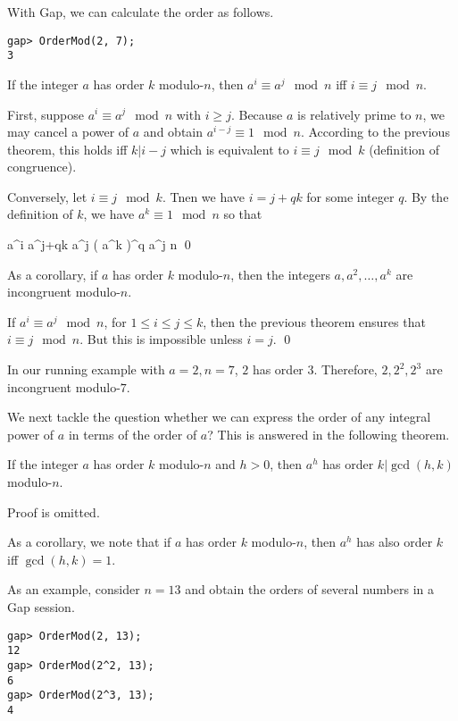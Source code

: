With Gap, we can calculate the order as follows.

\begin{verbatim}
gap> OrderMod(2, 7);
3
\end{verbatim}


\begin{theorem}\label{2021-03-02-th1}
  If the integer $a$ has order $k$ modulo-$n$, then $a^i \equiv a^j \mod n$ iff $i \equiv j \mod n$.
\end{theorem}

First, suppose $a^i \equiv a^j \mod n$ with $i \geq j$. Because $a$ is relatively prime to $n$, we may cancel a power of $a$ and obtain $a^{i-j} \equiv 1 \mod n$. According to the previous theorem, this holds iff $k | i-j$ which is equivalent to $i \equiv j \mod k$ (definition of congruence). 

Conversely, let $i \equiv j \mod k$. Tnen we have $i = j+  qk$ for some integer $q$. By the definition of $k$, we have $a^k \equiv 1 \mod n$ so that

\bee
a^i \equiv a^{j+qk} \equiv a^j \left( a^k \right)^q \equiv a^j \mod n \qed
\eee

As a corollary, if $a$ has order $k$ modulo-$n$, then the integers $a, a^2, \ldots, a^k$ are incongruent modulo-$n$.

If $a^i \equiv a^j \mod n$, for $1 \leq i \leq j \leq k$, then the previous theorem ensures that $i \equiv j \mod n$. But this is impossible unless $i=j$. \qed

In our running example with $a=2, n=7$, $2$ has order $3$. Therefore, $2, 2^2, 2^3$ are incongruent modulo-$7$.

We next tackle the question whether we can express the order of any integral power of $a$ in terms of the order of $a$? This is answered in the following theorem.

\begin{theorem}
  If the integer $a$ has order $k$ modulo-$n$ and $h > 0$, then $a^h$ has order $k | \gcd(h,k)$ modulo-$n$.
\end{theorem}

Proof is omitted.

As a corollary, we note that if $a$ has order $k$ modulo-$n$, then $a^h$ has also order $k$ iff $\gcd(h,k)=1$.

As an example, consider $n=13$ and obtain the orders of several numbers in a Gap session.

\begin{verbatim}
gap> OrderMod(2, 13);
12
gap> OrderMod(2^2, 13);
6
gap> OrderMod(2^3, 13);
4
\end{verbatim}

